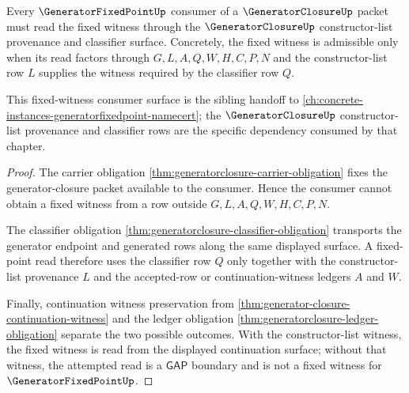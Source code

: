 \begin{theorem}
\label{thm:generatorclosure-fixedpoint-consumer-obligation}
Every $\GeneratorFixedPointUp$ consumer of a $\GeneratorClosureUp$ packet must read the fixed witness through the $\GeneratorClosureUp$ constructor-list provenance and classifier surface. Concretely, the fixed witness is admissible only when its read factors through $G,L,A,Q,W,H,C,P,N$ and the constructor-list row $L$ supplies the witness required by the classifier row $Q$.

This fixed-witness consumer surface is the sibling handoff to \autoref{ch:concrete-instances-generatorfixedpoint-namecert}; the $\GeneratorClosureUp$ constructor-list provenance and classifier rows are the specific dependency consumed by that chapter.
\end{theorem}
\begin{proof}
The carrier obligation \autoref{thm:generatorclosure-carrier-obligation} fixes the generator-closure packet available to the consumer. Hence the consumer cannot obtain a fixed witness from a row outside $G,L,A,Q,W,H,C,P,N$.

The classifier obligation \autoref{thm:generatorclosure-classifier-obligation} transports the generator endpoint and generated rows along the same displayed surface. A fixed-point read therefore uses the classifier row $Q$ only together with the constructor-list provenance $L$ and the accepted-row or continuation-witness ledgers $A$ and $W$.

Finally, continuation witness preservation from \autoref{thm:generator-closure-continuation-witness} and the ledger obligation \autoref{thm:generatorclosure-ledger-obligation} separate the two possible outcomes. With the constructor-list witness, the fixed witness is read from the displayed continuation surface; without that witness, the attempted read is a $\mathsf{GAP}$ boundary and is not a fixed witness for $\GeneratorFixedPointUp$.
\end{proof}

